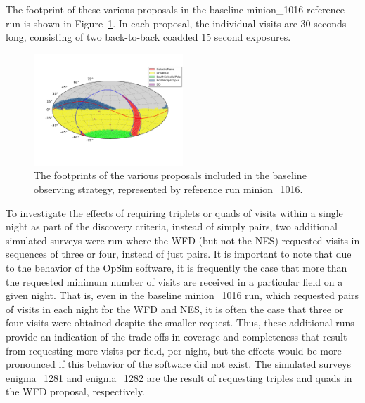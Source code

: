 The footprint of these various proposals in the baseline minion\_1016 reference run is shown in Figure~\ref{fig:minion_footprints}. In each proposal, the individual visits are 30 seconds long, consisting of two back-to-back coadded 15 second exposures. 

\begin{figure}
\centering
\includegraphics[width=0.5\textwidth]{figures/minion_1016_proposal_footprint}
\caption{The footprints of the various proposals included in the baseline observing strategy, represented by reference run minion\_1016. 
\label{fig:minion_footprints}}
\end{figure}

To investigate the effects of requiring triplets or quads of visits within a single night as part of the discovery criteria, instead of simply pairs, two additional simulated surveys were run where the WFD (but not the NES) requested visits in sequences of three or four, instead of just pairs. It is important to note that due to the behavior of the OpSim software, it is frequently the case that more than the requested minimum number of visits are received in a particular field on a given night. That is, even in the baseline minion\_1016 run, which requested pairs of visits in each night for the WFD and NES, it is often the case that three or four visits were obtained despite the smaller request. Thus, these additional runs provide an indication of the trade-offs in coverage and completeness that result from requesting more visits per field, per night, but the effects would be more pronounced if this behavior of the software did not exist. The simulated surveys enigma\_1281 and enigma\_1282 are the result of requesting triples and quads in the WFD proposal, respectively. 

